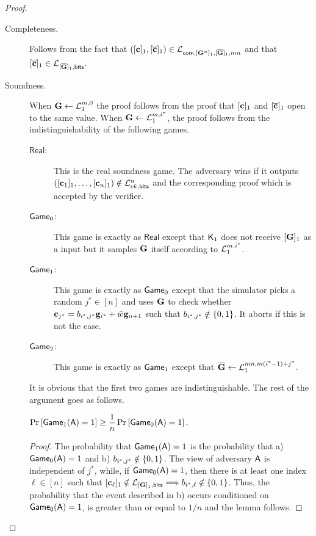 \begin{proof}
\begin{description}
\item[Completeness.]
Follows from the fact that $([\mathbf{c}]_1,[\overline{\mathbf{c}}]_1)\in\mathcal{L}_{\mathsf{com},[\mathbf{{G}}^n]_1,[\overline{\mathbf{{G}}}]_1,mn}$ and that $[\overline{\mathbf{c}}]_1\in\mathcal{L}_{[\overline{\mathbf{{G}}}]_1,\mathsf{bits}}$.

\item[Soundness.]
When $\mathbf{{G}}\gets\mathcal{L}_1^{m,0}$ the proof follows from the proof that $[\mathbf{c}]_1$ and $[{\overline{\mathbf{c}}}]_1$ open to the same value.
When $\mathbf{{G}}\gets\mathcal{L}_1^{m,i^*}$, the proof follows from the indistinguishability of the following games.

\begin{description}
\item[$\mathsf{Real}$:] This is the real soundness game. The adversary wins if it outputs $([\mathbf{c}_1]_1,\ldots,[\mathbf{c}_n]_1)\notin\mathcal{L}_{ck,\mathsf{bits}}^n$ and the corresponding proof which is accepted by the verifier.
\item[$\mathsf{Game}_0$:] This game is exactly as $\mathsf{Real}$ except that $\mathsf{K}_1$ does not receive $[\mathbf{{G}}]_1$ as a input but it samples $\mathbf{{G}}$ itself according to $\mathcal{L}_1^{m,i^*}$.
\item[$\mathsf{Game}_1$:] This game is exactly as $\mathsf{Game}_0$ except that the simulator picks a random $j^*\in[n]$ and uses $\mathbf{{G}}$ to check whether $\mathbf{c}_{j^*}=b_{i^*,j^*}\mathbf{g}_{i^*}+\tilde{w}\mathbf{g}_{n+1}$ such that $b_{i^*,j^*}\notin\{0,1\}$. It aborts if this is not the case.
\item[$\mathsf{Game}_2$:] This game is exactly as $\mathsf{Game}_1$ except that $\overline{\mathbf{{G}}}\gets\mathcal{L}_1^{mn, m(i^*-1)+j^*}$.
\end{description}

It is obvious that the first two games are indistinguishable. 
The rest of the argument goes as follows. 

\begin{lemma} $\Pr\left[ \mathsf{Game}_1(\mathsf{A})=1\right]\geq\dfrac{1}{n}\Pr\left[\mathsf{Game}_0(\mathsf{A})=1\right].$
\end{lemma}

\begin{proof}  The probability that
 $\mathsf{Game}_1(\mathsf{A})=1$ is the probability that  a) $\mathsf{Game}_0(\mathsf{A})=1$ and
b)  $b_{i^*,j^*} \notin \{0,1\}$. The view of adversary $\mathsf{A}$ is independent of $j^*$, while, if $\mathsf{Game_0}(\mathsf{A})=1$, then there is at least one index $\ell \in [n]$ such that $[\mathbf{c}_\ell]_1\notin\mathcal{L}_{[\mathbf{{G}}]_1,\mathsf{bits}}\Longrightarrow b_{i^*,\ell} \notin \{0,1\}$. Thus, 
the probability that the event described in b) occurs conditioned on $\mathsf{Game_0}(\mathsf{A})=1$, is greater than or equal to $1/n$ and the lemma follows.
\end{proof}


\end{description}
\end{proof}
